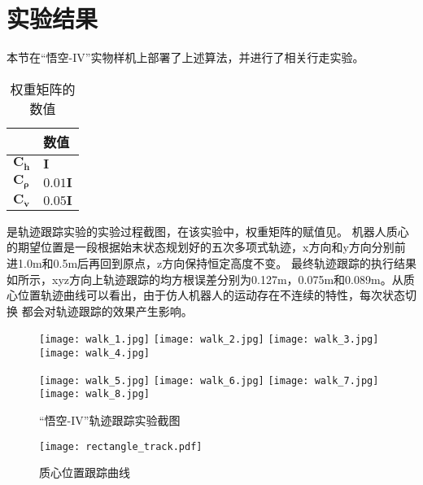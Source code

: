 \section{实验结果}
\label{sec:controller_exp}
本节在“悟空-IV”实物样机上部署了上述算法，并进行了相关行走实验。
\begin{table}[htbp]
	\centering
	\caption{权重矩阵的数值}
	\label{tab:qp_weight}
	\begin{tabular}{m{2cm}<{\centering}m{2cm}<{\centering}}
		\toprule  %
		\fangsong{参数名称}   &数值  \\
		\midrule  %
		${{\boldsymbol{C}}_{{\dot{\boldsymbol{h}}}}}$    & $\mathbf{I}$\\
		${\boldsymbol{{C}}_{\boldsymbol{\rho} }}$ &  $0.01 \mathbf{I}$ \\
		${\boldsymbol{C}_{{\dot{\boldsymbol{v}}}}}$ & $0.05 \mathbf{I}$ \\
		\bottomrule %
	\end{tabular}
\end{table}
是轨迹跟踪实验的实验过程截图，在该实验中，权重矩阵的赋值见。
机器人质心的期望位置是一段根据始末状态规划好的五次多项式轨迹，x方向和y方向分别前进1.0m和0.5m后再回到原点，z方向保持恒定高度不变。
最终轨迹跟踪的执行结果如所示，xyz方向上轨迹跟踪的均方根误差分别为0.127m，0.075m和0.089m。从质心位置轨迹曲线可以看出，由于仿人机器人的运动存在不连续的特性，每次状态切换
都会对轨迹跟踪的效果产生影响。
\begin{figure}[htbp]
    \centering
    \texttt{[image: walk\_1.jpg]}
    \texttt{[image: walk\_2.jpg]}
    \texttt{[image: walk\_3.jpg]}
    \texttt{[image: walk\_4.jpg]}

    \texttt{[image: walk\_5.jpg]}
    \texttt{[image: walk\_6.jpg]}
    \texttt{[image: walk\_7.jpg]}
    \texttt{[image: walk\_8.jpg]}   
    \caption{\label{fig:track_exp}“悟空-IV”轨迹跟踪实验截图}
\end{figure}
\begin{figure}[htbp]
    \centering
    \texttt{[image: rectangle\_track.pdf]}
    \caption{\label{fig:com_pos_track}质心位置跟踪曲线}
\end{figure}

